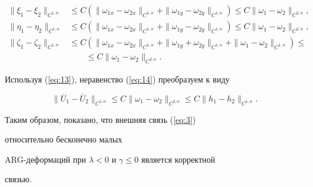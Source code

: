 \begin{pf}
\begin{align*}


\| {\xi _1 - \xi _2 } \|_{C^{1,\alpha }} &\le C ({ \|


{\omega _{1x} - \omega _{2x} } \|_{C^{1,\alpha }} +


\| {\omega _{1y} - \omega _{2y} } \|_{C^{1,\alpha }} }) \le C \| 


{\omega _1 - \omega _2 } \|_{C^{2,\alpha }}, \\


%


\| {\eta _1 - \eta _2 } \|_{C^{1,\alpha }} &\le C ({ \| 


{\omega _{1x} - \omega _{2x} } \|_{C^{1,\alpha }} +


\| {\omega _{1y} - \omega _{2y} } \|_{C^{1,\alpha }} }) \le C \| 


{\omega _1 - \omega _2 } \|_{C^{2,\alpha }},\\ 


%


\| {\zeta_1 - \zeta_2 } \|_{C^{1,\alpha }} &\le C (


{ \| {\omega_{1x} - \omega_{2x} } \|_{C^{1,\alpha }}+\| 


{\omega_{1y}+\omega_{2y} } \|_{C^{1,\alpha }} +


\| {\omega_1 - \omega_2 } \|_{C^{1,\alpha }} }) \le \\


%


&\qquad \le C \| {\omega_1 - \omega_2 } \|_{C^{2,\alpha }}.


\end{align*}


Используя (\ref{eq:13}), неравенство (\ref{eq:14}) преобразуем к виду


$$


\| {\overline U_1 - \overline U_2 } \|_{C^{1, \alpha }} \le 


C \| {\omega_1 - \omega_2 } \|_{C^{2,\alpha }} \le C


\| {h_1 - h_2 } \|_{C^{1, \alpha }}.


$$


Таким образом, показано, что внешняя связь (\ref{eq:3}) 


относительно бесконечно малых 


ARG-де\-фор\-ма\-ций при $\lambda < 0$ и $\gamma \le 0$ является корректной 


связью.


\end{pf}






